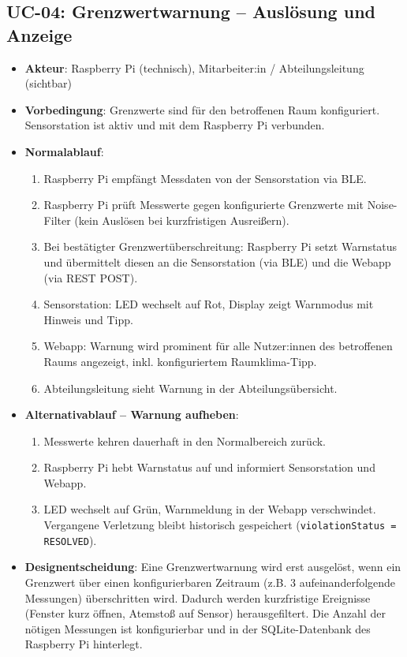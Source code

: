 \documentclass[12pt,a4paper]{article}
\begin{document}
\subsection{UC-04: Grenzwertwarnung -- Auslösung und Anzeige}
\begin{itemize}
	\item \textbf{Akteur}: Raspberry Pi (technisch), Mitarbeiter:in / Abteilungsleitung (sichtbar)
	\item \textbf{Vorbedingung}: Grenzwerte sind für den betroffenen Raum konfiguriert. Sensorstation ist aktiv und mit dem Raspberry Pi verbunden.
	\item \textbf{Normalablauf}:
	\begin{enumerate}
		\item Raspberry Pi empfängt Messdaten von der Sensorstation via BLE.
		\item Raspberry Pi prüft Messwerte gegen konfigurierte Grenzwerte mit Noise-Filter (kein Auslösen bei kurzfristigen Ausreißern).
		\item Bei bestätigter Grenzwertüberschreitung: Raspberry Pi setzt Warnstatus und übermittelt diesen an die Sensorstation (via BLE) und die Webapp (via REST POST).
		\item Sensorstation: LED wechselt auf Rot, Display zeigt Warnmodus mit Hinweis und Tipp.
		\item Webapp: Warnung wird prominent für alle Nutzer:innen des betroffenen Raums angezeigt, inkl. konfiguriertem Raumklima-Tipp.
		\item Abteilungsleitung sieht Warnung in der Abteilungsübersicht.
	\end{enumerate}
	\item \textbf{Alternativablauf -- Warnung aufheben}:
	\begin{enumerate}
		\item Messwerte kehren dauerhaft in den Normalbereich zurück.
		\item Raspberry Pi hebt Warnstatus auf und informiert Sensorstation und Webapp.
		\item LED wechselt auf Grün, Warnmeldung in der Webapp verschwindet. Vergangene Verletzung bleibt historisch gespeichert (\texttt{violationStatus = RESOLVED}).
	\end{enumerate}
	\item \textbf{Designentscheidung}: Eine Grenzwertwarnung wird erst ausgelöst, wenn ein Grenzwert über einen konfigurierbaren Zeitraum (z.B. 3 aufeinanderfolgende Messungen) überschritten wird. Dadurch werden kurzfristige Ereignisse (Fenster kurz öffnen, Atemstoß auf Sensor) herausgefiltert. Die Anzahl der nötigen Messungen ist konfigurierbar und in der SQLite-Datenbank des Raspberry Pi hinterlegt.
\end{itemize}
\end{document}
